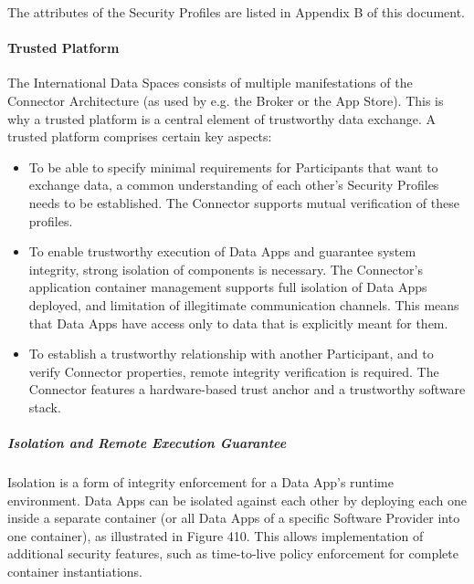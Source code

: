 

The attributes of the Security Profiles are listed in Appendix B of this document. 

\paragraph{Trusted Platform \\}
The International Data Spaces consists of multiple manifestations of the Connector Architecture (as used by e.g. the Broker or the App Store). This is why a trusted platform is a central element of trustworthy data exchange. A trusted platform comprises certain key aspects:

\begin{itemize}
	\item To be able to specify minimal requirements for Participants that want to exchange data, a common understanding of each other’s Security Profiles needs to be established. The Connector supports mutual verification of these profiles.

	\item To enable trustworthy execution of Data Apps and guarantee system integrity, strong isolation of components is necessary. The Connector's application container management supports full isolation of Data Apps deployed, and limitation of illegitimate communication channels. This means that Data Apps have access only to data that is explicitly meant for them.

	\item To establish a trustworthy relationship with another Participant, and to verify Connector properties, remote integrity verification is required. The Connector features a hardware-based trust anchor and a trustworthy software stack.
\end{itemize}

\subparagraph*{Isolation and Remote Execution Guarantee \\}
Isolation is a form of integrity enforcement for a Data App’s runtime environment. Data Apps can be isolated against each other by deploying each one inside a separate container (or all Data Apps of a specific Software Provider into one container), as illustrated in Figure 410. This allows implementation of additional security features, such as time-to-live policy enforcement for complete container instantiations.



